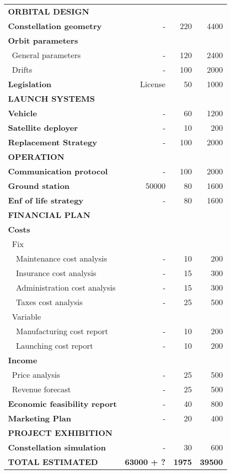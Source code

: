 \begin{longtable}{| l | r | r |r | }
\rowcolor[gray]{0.85}	\textbf{ORBITAL DESIGN} & &  & \\

	\textbf{Constellation geometry} & - & 220  & 4400  \\
	\hline
	\textbf{Orbit parameters} & &   &  \\
	   \blue ~General parameters & - & 120 & 2400 \\
	   \blue ~Drifts & - & 100  & 2000  \\
	\hline
	\textbf{Legislation} & License & 50 & 1000 \\
   
\rowcolor[gray]{0.85} \textbf{LAUNCH SYSTEMS} & &  &   \\
	
	\textbf{Vehicle} & - & 60 & 1200 \\
	\hline
	\textbf{Satellite deployer} & - & 10 & 200  \\
	\hline
	\textbf{Replacement Strategy} & - & 100 & 2000  \\
	
\rowcolor[gray]{0.85} \textbf{OPERATION} & &  &  \\
	
	\textbf{Communication protocol} & - & 100 & 2000 \\
	\hline
	\textbf{Ground station} & 50000 & 80 & 1600 \\
	\hline
	\textbf{Enf of life strategy} & - & 80  & 1600 \\
	\hline

\pagebreak

	\hline
\rowcolor[gray]{0.85} \textbf{FINANCIAL PLAN} & &  & \\
	
	\textbf{Costs} & & & \\
	   \blue ~Fix & &  &   \\
	   ~~Maintenance cost analysis & - & 10 & 200 \\
	   ~~Insurance cost analysis & - & 15 & 300 \\
	   ~~Administration cost analysis & - & 15 & 300 \\
	   ~~Taxes cost analysis & - & 25 & 500 \\
	   \blue ~Variable & &  & \\
	   ~~Manufacturing cost report & - & 10 & 200 \\
	   ~~Launching cost report & - & 10 & 200 \\
	\hline
	\textbf{Income} & & &  \\
	   \blue ~Price analysis & - & 25  & 500  \\
	   \blue ~Revenue forecast & - & 25  & 500  \\
	\hline
	\textbf{Economic feasibility report} & - & 40 & 800 \\
	\hline
	\textbf{Marketing Plan} & - & 20 & 400 \\
\rowcolor[gray]{0.85} \textbf{PROJECT EXHIBITION} & & &  \\

	\textbf{Constellation simulation} & - & 30 & 600 \\

\rowcolor[gray]{0.65} \textbf{TOTAL ESTIMATED} & \textbf{63000 + ?} & \textbf{1975} & \textbf{39500} \\
    \hline

\end{longtable}